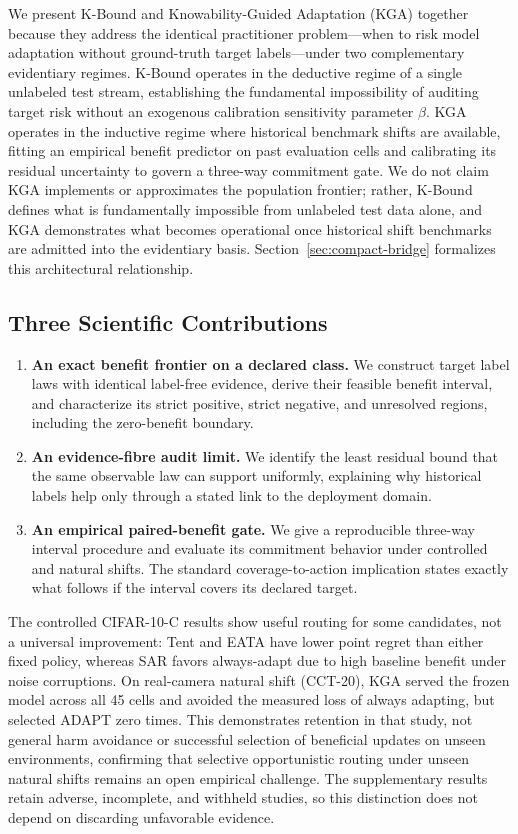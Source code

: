 We present K-Bound and Knowability-Guided Adaptation (KGA) together because they address the
identical practitioner problem---when to risk model adaptation without ground-truth target
labels---under two complementary evidentiary regimes. K-Bound operates in the deductive regime of
a single unlabeled test stream, establishing the fundamental impossibility of auditing target risk
without an exogenous calibration sensitivity parameter $\beta$. KGA operates in the inductive regime
where historical benchmark shifts are available, fitting an empirical benefit predictor on past
evaluation cells and calibrating its residual uncertainty to govern a three-way commitment gate.
We do not claim KGA implements or approximates the population frontier; rather, K-Bound defines
what is fundamentally impossible from unlabeled test data alone, and KGA demonstrates what becomes
operational once historical shift benchmarks are admitted into the evidentiary basis.
Section~\ref{sec:compact-bridge} formalizes this architectural relationship.

\subsection{Three Scientific Contributions}

\begin{enumerate}
  \item \textbf{An exact benefit frontier on a declared class.}
  We construct target label laws with identical label-free evidence, derive their feasible benefit
  interval, and characterize its strict positive, strict negative, and unresolved regions,
  including the zero-benefit boundary.
  \item \textbf{An evidence-fibre audit limit.}
  We identify the least residual bound that the same observable law can support uniformly,
  explaining why historical labels help only through a stated link to the deployment domain.
  \item \textbf{An empirical paired-benefit gate.}
  We give a reproducible three-way interval procedure and evaluate its commitment behavior under
  controlled and natural shifts. The standard coverage-to-action implication states exactly what
  follows if the interval covers its declared target.
\end{enumerate}

The controlled CIFAR-10-C results show useful routing for some candidates, not a universal
improvement: Tent and EATA have lower point regret than either fixed policy, whereas SAR favors
always-adapt due to high baseline benefit under noise corruptions. On real-camera natural shift
(CCT-20), KGA served the frozen model across all 45 cells and avoided the measured loss of
always adapting, but selected ADAPT zero times. This demonstrates retention in that study,
not general harm avoidance or successful selection of beneficial updates on unseen environments,
confirming that selective opportunistic routing under unseen natural shifts remains an open
empirical challenge. The supplementary results
retain adverse, incomplete, and withheld studies, so this distinction does not depend on discarding
unfavorable evidence.

